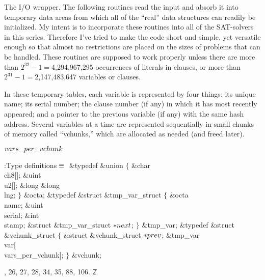 The I/O wrapper. The following routines read the input and absorb it
into
temporary data areas from which all of the ``real'' data structures
can readily be initialized. My intent is to incorporate these routines into all
of the SAT-solvers in this series. Therefore I've tried to make the code
short and simple, yet versatile enough so that almost no restrictions are
placed on the sizes of problems that can be handled. These routines are
supposed to work properly unless there are more than
$2^{32}-1=4$,294,967,295 occurrences of literals in clauses,
or more than $2^{31}-1=2$,147,483,647 variables or clauses.

In these temporary tables, each variable is represented by four things:
its unique name; its serial number; the clause number (if any) in which it has
most recently appeared; and a pointer to the previous variable (if any)
with the same hash address. Several variables at a time
are represented sequentially in small chunks of memory called ``vchunks,''
which are allocated as needed (and freed later).

\Y\B\4\D$\\{vars\_per\_vchunk}$ \5
\par
\Y\B\4:Type definitions\X${}\equiv{}$\6
\&{typedef} \&{union} ${}\{{}$\1\6
\&{char} \\{ch8}[];\6
\&{uint} \\{u2}[];\6
\&{long} \&{long} \\{lng};\2\6
${}\}{}$ \&{octa};\6
\&{typedef} \&{struct} \&{tmp\_var\_struct} ${}\{{}$\1\6
\&{octa} \\{name};\6
\&{uint} \\{serial};\6
\&{int} \\{stamp};\6
\&{struct} \&{tmp\_var\_struct} ${}{*}\\{next}{}$;\2%
\6
${}\}{}$ \&{tmp\_var};\7
\&{typedef} \&{struct} \&{vchunk\_struct} ${}\{{}$\1\6
\&{struct} \&{vchunk\_struct} ${}{*}\\{prev}{}$;\6
\&{tmp\_var} \\{var}[\\{vars\_per\_vchunk}];\2\6
${}\}{}$ \&{vchunk};\par
{}, 26, 27, 28, 34, 35, 88, 106.
\U2.\fi

